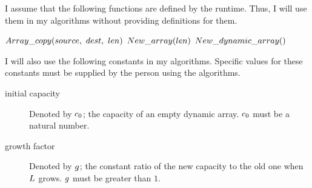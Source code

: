 I assume that the following functions are defined by the runtime. Thus, I will use them in my algorithms without providing definitions for them.

\begin{algorithm}[H]
	\begin{algorithmic}
		\State $\FuncArrayCopy(source,\ dest,\ len)$
		\State
		\State $New\_array(len)$
		\State
		\State $New\_dynamic\_array()$
	\end{algorithmic}
\end{algorithm}

I will also use the following constants in my algorithms. Specific values for these constants must be supplied by the person using the algorithms.

\begin{description}
	\item[initial capacity] Denoted by $c_0$; the capacity of an empty dynamic array. $c_0$ must be a natural number.
	\item[growth factor] Denoted by $g$; the constant ratio of the new capacity to the old one when $L$ grows. $g$ must be greater than $1$.
\end{description}